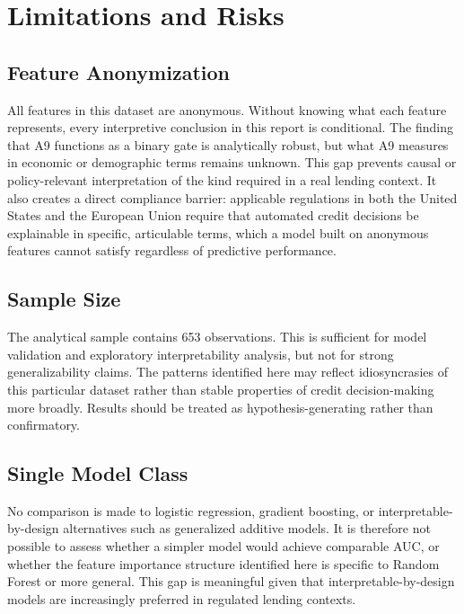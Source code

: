 \documentclass[11pt]{article}
\begin{document}
\newpage

\section{Limitations and Risks}
\label{sec:limitations}

\subsection{Feature Anonymization}

All features in this dataset are anonymous. Without knowing what each feature represents, every interpretive conclusion in this report is conditional. The finding that A9 functions as a binary gate is analytically robust, but what A9 measures in economic or demographic terms remains unknown. This gap prevents causal or policy-relevant interpretation of the kind required in a real lending context. It also creates a direct compliance barrier: applicable regulations in both the United States and the European Union require that automated credit decisions be explainable in specific, articulable terms, which a model built on anonymous features cannot satisfy regardless of predictive performance.

\subsection{Sample Size}

The analytical sample contains 653 observations. This is sufficient for model validation and exploratory interpretability analysis, but not for strong generalizability claims. The patterns identified here may reflect idiosyncrasies of this particular dataset rather than stable properties of credit decision-making more broadly. Results should be treated as hypothesis-generating rather than confirmatory.

\subsection{Single Model Class}

No comparison is made to logistic regression, gradient boosting, or interpretable-by-design alternatives such as generalized additive models. It is therefore not possible to assess whether a simpler model would achieve comparable AUC, or whether the feature importance structure identified here is specific to Random Forest or more general. This gap is meaningful given that interpretable-by-design models are increasingly preferred in regulated lending contexts.
\end{document}
